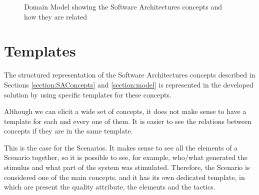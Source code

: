 \begin{figure}
\caption{Domain Model showing the Software Architectures concepts and how they are related}
\label{figure:abstractDomainModel}
\end{figure}

\section{Templates}
\label{section:templates}
The structured representation of the Software Architectures concepts described in Sections \ref{section:SAConcepts} and \ref{section:model} is represented in the developed solution by using specific templates for these concepts.

Although we can elicit a wide set of concepts, it does not make sense to have a template for each and every one of them. It is easier to see the relations between concepts if they are in the same template. 

This is the case for the Scenarios. It makes sense to see all the elements of a Scenario together, so it is possible to see, for example, who/what generated the stimulus and what part of the system was stimulated. Therefore, the Scenario is considered one of the main concepts, and it has its own dedicated template, in which are present the quality attribute, the elements and the tactics. 


